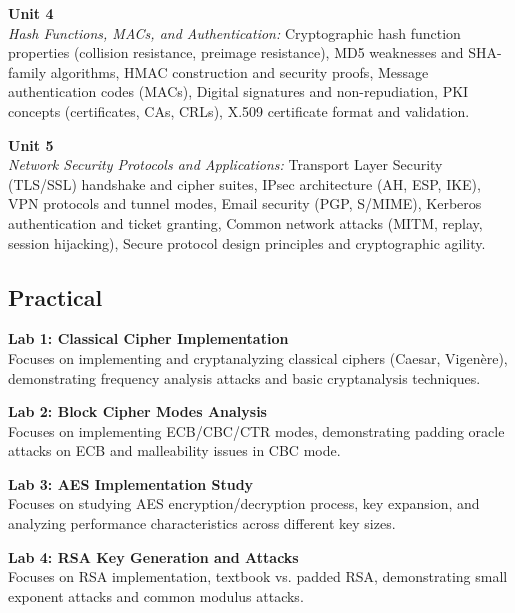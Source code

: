 \noindent\textbf{Unit 4} \\
\textit{Hash Functions, MACs, and Authentication:} Cryptographic hash function properties (collision resistance, preimage resistance), MD5 weaknesses and SHA-family algorithms, HMAC construction and security proofs, Message authentication codes (MACs), Digital signatures and non-repudiation, PKI concepts (certificates, CAs, CRLs), X.509 certificate format and validation.

\vspace{0.3cm}

\noindent\textbf{Unit 5} \\
\textit{Network Security Protocols and Applications:} Transport Layer Security (TLS/SSL) handshake and cipher suites, IPsec architecture (AH, ESP, IKE), VPN protocols and tunnel modes, Email security (PGP, S/MIME), Kerberos authentication and ticket granting, Common network attacks (MITM, replay, session hijacking), Secure protocol design principles and cryptographic agility.

\newpage

\subsection*{Practical}
\noindent\textbf{Lab 1: Classical Cipher Implementation} \\
Focuses on implementing and cryptanalyzing classical ciphers (Caesar, Vigenère), demonstrating frequency analysis attacks and basic cryptanalysis techniques.

\vspace{0.2cm}

\noindent\textbf{Lab 2: Block Cipher Modes Analysis} \\
Focuses on implementing ECB/CBC/CTR modes, demonstrating padding oracle attacks on ECB and malleability issues in CBC mode.

\vspace{0.2cm}

\noindent\textbf{Lab 3: AES Implementation Study} \\
Focuses on studying AES encryption/decryption process, key expansion, and analyzing performance characteristics across different key sizes.

\vspace{0.2cm}

\noindent\textbf{Lab 4: RSA Key Generation and Attacks} \\
Focuses on RSA implementation, textbook vs. padded RSA, demonstrating small exponent attacks and common modulus attacks.

